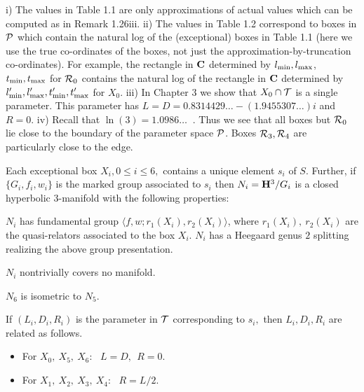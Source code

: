   i)  The values in Table 1.1 are only 
approximations of actual values which can be computed as in Remark 1.26iii.
ii)  The values in Table 1.2 correspond to boxes in ${\cal P}$ which contain the natural log of the (exceptional) boxes in Table 1.1 (here we use the true co-ordinates of the boxes, not just the approximation-by-truncation co-ordinates).  
For example,
 the rectangle in ${\bf C}$ determined by $l_{\rm min}, l_{\rm max}$,
$t_{\rm min}, t_{\rm max}$ for ${\cal R}_0$ contains the natural log of the rectangle in ${\bf C}$ determined by $l'_{\rm min},
l'_{\rm max}, t'_{\rm min}, t'_{\rm max}$ for $X_0$.  
iii)  In Chapter 3 we show that $X_0 \cap {\cal T}$ is a single parameter.  
This parameter has $L=D=0.8314429\ldots  -  (1.9455307\ldots) i $   and $R=0.$
iv)  Recall that $\ln(3)=1.0986\ldots\ $  .  Thus we see that all boxes
but ${\cal R}_0$ lie
close to the boundary of the parameter space ${\cal P}$.  
Boxes ${\cal R}_3, {\cal R}_4$ are particularly close to the edge.
\enddemo

Each  exceptional 
box $X_i, 0\le i\le 6,$ contains a unique element $s_i$ of $S.$
Further{\rm ,} if $\{G_i, f_i, w_i\}$ is the marked group
associated to $s_i$ then
$N_i = {\bf H}^3/G_i$ is a closed hyperbolic $3$\/{\rm -}\/manifold
with the following properties\/{\rm :}
\begin{itemize}
 $N_i$ has fundamental group
$\langle f,w;r_1(X_i),r_2(X_i)\rangle${\rm ,}
where $r_1(X_i),\ r_2(X_i)$ are the quasi\/{\rm -}\/relators
associated to the box $X_i.$
  $N_i$ has a Heegaard genus $2$ splitting realizing the above group presentation.

 $N_i$ nontrivially covers no manifold.  

 $N_6$ is isometric to $N_5.$
 
 If $(L_i, D_i, R_i)$ is the parameter in ${\cal T}$
corresponding to $s_i,$ then $L_i, D_i, R_i$ are related as follows.
\begin{itemize}
\item[] For $X_0,\ X_5,\ X_6:\ \ \ L=D, \ \ R=0.$  

\item[] For $X_1,\ X_2,\ X_3,\ X_4:\ \ \ R=L/2.$
\end{itemize}
\end{itemize}
\endproclaim

